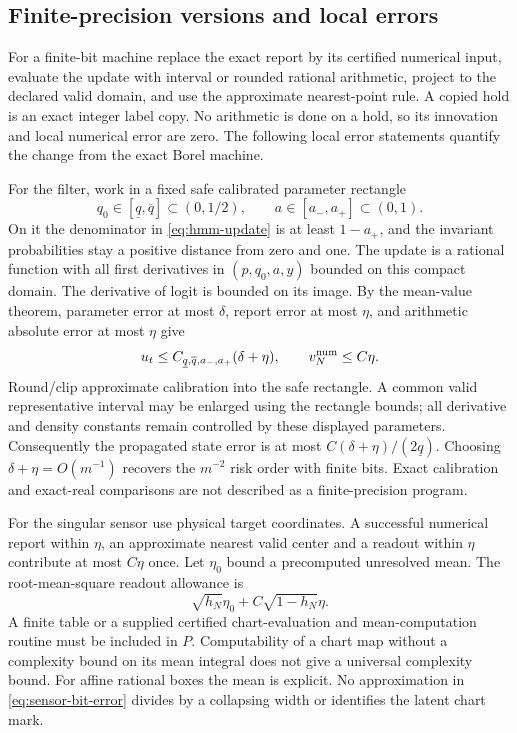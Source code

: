 \subsection{Finite-precision versions and local errors}
For a finite-bit machine replace the exact report by its certified numerical input, evaluate the update with interval or rounded rational arithmetic, project to the declared valid domain, and use the approximate nearest-point rule. A copied hold is an exact integer label copy. No arithmetic is done on a hold, so its innovation and local numerical error are zero. The following local error statements quantify the change from the exact Borel machine.

For the filter, work in a fixed safe calibrated parameter rectangle
\[
 q_0\in[\underline q,\overline q]\subset(0,1/2),\qquad
 a\in[a_-,a_+]\subset(0,1).
\]
On it the denominator in \eqref{eq:hmm-update} is at least $1-a_+$, and the invariant probabilities stay a positive distance from zero and one. The update is a rational function with all first derivatives in $(p,q_0,a,y)$ bounded on this compact domain. The derivative of logit is bounded on its image. By the mean-value theorem, parameter error at most $\delta$, report error at most $\eta$, and arithmetic absolute error at most $\eta$ give
\begin{equation}\label{eq:filter-bit-error}
 u_t\le C_{\underline q,\overline q,a_-,a_+}(\delta+\eta),
 \qquad v_N^{\rm num}\le C\eta.
\end{equation}
Round/clip approximate calibration into the safe rectangle. A common valid representative interval may be enlarged using the rectangle bounds; all derivative and density constants remain controlled by these displayed parameters. Consequently the propagated state error is at most $C(\delta+\eta)/(2\underline q)$. Choosing $\delta+\eta=O(m^{-1})$ recovers the $m^{-2}$ risk order with finite bits. Exact calibration and exact-real comparisons are not described as a finite-precision program.

For the singular sensor use physical target coordinates. A successful numerical report within $\eta$, an approximate nearest valid center and a readout within $\eta$ contribute at most $C\eta$ once. Let $\eta_0$ bound a precomputed unresolved mean. The root-mean-square readout allowance is
\begin{equation}\label{eq:sensor-bit-error}
 \sqrt{h_N}\eta_0+C\sqrt{1-h_N}\eta.
\end{equation}
A finite table or a supplied certified chart-evaluation and mean-computation routine must be included in $P$. Computability of a chart map without a complexity bound on its mean integral does not give a universal complexity bound. For affine rational boxes the mean is explicit. No approximation in \eqref{eq:sensor-bit-error} divides by a collapsing width or identifies the latent chart mark.

